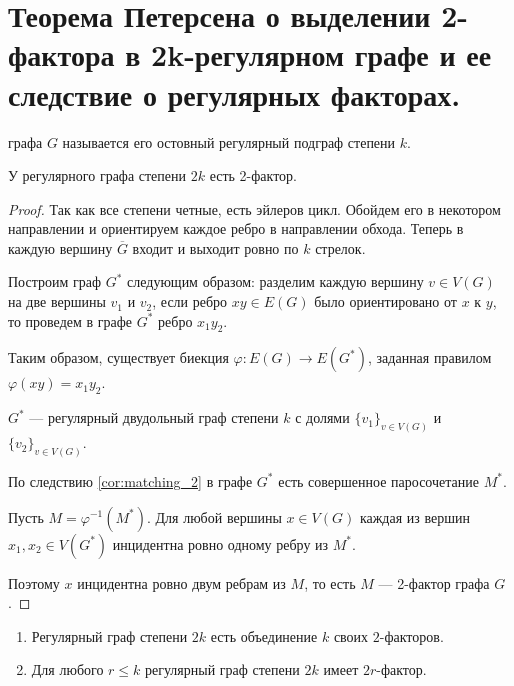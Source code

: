 \section{Теорема Петерсена о выделении 2-фактора в 2k-регулярном графе и ее следствие о регулярных факторах.}
\begin{definition}
     графа $G$ называется его остовный регулярный подграф степени $k$.
\end{definition}

\begin{theorem}[Петерсон, 1891]
    У регулярного графа степени $2k$ есть 2-фактор.
\end{theorem}

\begin{proof}
    Так как все степени четные, есть эйлеров цикл. Обойдем его в некотором направлении и ориентируем каждое ребро в направлении обхода. Теперь в каждую вершину $\overline{G}$ входит и выходит ровно по $k$ стрелок.

	Построим граф $G^*$ следующим образом: разделим каждую вершину $v \in V(G)$ на две вершины $v_1$ и $v_2$, если ребро $xy \in E(G)$ было ориентировано от $x$ к $y$, то проведем в графе $G^*$ ребро $x_1y_2$.

	Таким образом, существует биекция $\varphi\colon E(G) \to E(G^*)$, заданная правилом $\varphi(xy) = x_1y_2$.

	$G^*$ --- регулярный двудольный граф степени $k$ с долями $\{v_1\}_{v \in V(G)}$ и $\{v_2\}_{v \in  V(G)}$.

	По следствию \ref{cor:matching_2} в графе $G^*$ есть совершенное паросочетание $M^*$.

	Пусть $M = \varphi^{-1}(M^*)$. Для любой вершины $x \in V(G)$ каждая из вершин $x_1, x_2 \in  V(G^*)$ инцидентна ровно одному ребру из $M^*$.

	Поэтому $x$ инцидентна ровно двум ребрам из $M$, то есть $M$ --- 2-фактор графа $G$.
\end{proof}

\begin{corollary}
    \begin{enumerate}
		\item Регулярный граф степени $2k$ есть объединение $k$ своих $2$-факторов.
		\item Для любого $r \le k$ регулярный граф степени $2k$ имеет $2r$-фактор.
    \end{enumerate}
\end{corollary}
